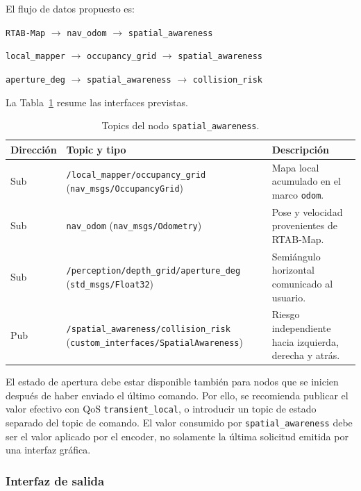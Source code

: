 El flujo de datos propuesto es:
%
\begin{center}
\texttt{RTAB-Map}
$\longrightarrow$
\texttt{nav\_odom}
$\longrightarrow$
\texttt{spatial\_awareness}

\texttt{local\_mapper}
$\longrightarrow$
\texttt{occupancy\_grid}
$\longrightarrow$
\texttt{spatial\_awareness}

\texttt{aperture\_deg}
$\longrightarrow$
\texttt{spatial\_awareness}
$\longrightarrow$
\texttt{collision\_risk}
\end{center}

La Tabla~\ref{tab:sa-topics} resume las interfaces previstas.

\begin{table}[ht]
  \centering
  \caption{Topics del nodo \texttt{spatial\_awareness}.}
  \label{tab:sa-topics}
  \small
  \begin{tabular}{llp{7cm}}
    \hline
    \textbf{Dirección} & \textbf{Topic y tipo} & \textbf{Descripción} \\
    \hline
    Sub &
    \texttt{/local\_mapper/occupancy\_grid}
    (\texttt{nav\_msgs/OccupancyGrid}) &
    Mapa local acumulado en el marco \texttt{odom}. \\

    Sub &
    \texttt{nav\_odom}
    (\texttt{nav\_msgs/Odometry}) &
    Pose y velocidad provenientes de RTAB-Map. \\

    Sub &
    \texttt{/perception/depth\_grid/aperture\_deg}
    (\texttt{std\_msgs/Float32}) &
    Semiángulo horizontal comunicado al usuario. \\

    Pub &
    \texttt{/spatial\_awareness/collision\_risk}
    (\texttt{custom\_interfaces/SpatialAwareness}) &
    Riesgo independiente hacia izquierda, derecha y atrás. \\
    \hline
  \end{tabular}
\end{table}

El estado de apertura debe estar disponible también para nodos que se inicien
después de haber enviado el último comando. Por ello, se recomienda publicar
el valor efectivo con QoS \texttt{transient\_local}, o introducir un topic de
estado separado del topic de comando. El valor consumido por
\texttt{spatial\_awareness} debe ser el valor aplicado por el encoder, no
solamente la última solicitud emitida por una interfaz gráfica.

\subsubsection{Interfaz de salida}
\label{subsubsec:sa-output}

